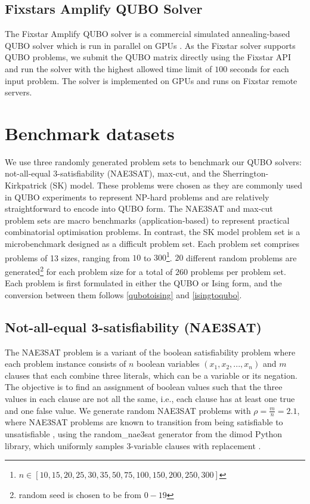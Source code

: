 
\subsection{Fixstars Amplify QUBO Solver}
The Fixstar Amplify QUBO solver is a commercial simulated annealing-based QUBO solver which is run in parallel on GPUs \cite{b12}. As the Fixstar solver supports QUBO problems, we submit the QUBO matrix directly using the Fixstar API and run the solver with the highest allowed time limit of $100$ seconds for each input problem. The solver is implemented on GPUs and runs on Fixstar remote servers.

\section{Benchmark datasets}
We use three randomly generated problem sets to benchmark our QUBO solvers: not-all-equal 3-satisfiability (NAE3SAT), max-cut, and the Sherrington-Kirkpatrick (SK) model. These problems were chosen as they are commonly used in QUBO experiments to represent NP-hard problems and are relatively straightforward to encode into QUBO form. The NAE3SAT and max-cut problem sets are macro benchmarks (application-based) to represent practical combinatorial optimisation problems. In contrast, the SK model problem set is a microbenchmark designed as a difficult problem set. Each problem set comprises problems of 13 sizes, ranging from $10$ to $300$\footnote{$n \in [10,15,20,25,30,35,50,75,100,150,200,250,300]$}. $20$ different random problems are generated\footnote{random seed is chosen to be from $0-19$} for each problem size for a total of $260$ problems per problem set. Each problem is first formulated in either the QUBO or Ising form, and the conversion between them follows \autoref{qubotoising} and \autoref{isingtoqubo}.

\subsection*{Not-all-equal 3-satisfiability (NAE3SAT)}
The NAE3SAT problem is a variant of the boolean satisfiability problem where each problem instance consists of $n$ boolean variables $(x_1, x_2, ..., x_n)$ and $m$ clauses that each combine three literals, which can be a variable or its negation. The objective is to find an assignment of boolean values such that the three values in each clause are not all the same, i.e., each clause has at least one true and one false value. We generate random NAE3SAT problems with $\rho = \frac{m}{n} = 2.1$, where NAE3SAT problems are known to transition from being satisfiable to unsatisfiable \cite{nae3sattransition}, using the random\_nae3sat generator from the dimod Python library, which uniformly samples 3-variable clauses with replacement \cite{dimodrandomnae3sat}. 

